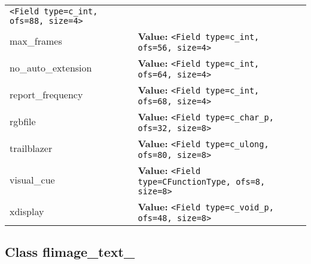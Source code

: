 \begin{longtable}{|p{\varnamewidth}|p{\vardescrwidth}|l}
{\tt {\textless}Field type=c\_int, ofs=88, size=4{\textgreater}}&\\
\cline{1-2}
\raggedright m\-a\-x\-\_\-f\-r\-a\-m\-e\-s\- & \raggedright \textbf{Value:} 
{\tt {\textless}Field type=c\_int, ofs=56, size=4{\textgreater}}&\\
\cline{1-2}
\raggedright n\-o\-\_\-a\-u\-t\-o\-\_\-e\-x\-t\-e\-n\-s\-i\-o\-n\- & \raggedright \textbf{Value:} 
{\tt {\textless}Field type=c\_int, ofs=64, size=4{\textgreater}}&\\
\cline{1-2}
\raggedright r\-e\-p\-o\-r\-t\-\_\-f\-r\-e\-q\-u\-e\-n\-c\-y\- & \raggedright \textbf{Value:} 
{\tt {\textless}Field type=c\_int, ofs=68, size=4{\textgreater}}&\\
\cline{1-2}
\raggedright r\-g\-b\-f\-i\-l\-e\- & \raggedright \textbf{Value:} 
{\tt {\textless}Field type=c\_char\_p, ofs=32, size=8{\textgreater}}&\\
\cline{1-2}
\raggedright t\-r\-a\-i\-l\-b\-l\-a\-z\-e\-r\- & \raggedright \textbf{Value:} 
{\tt {\textless}Field type=c\_ulong, ofs=80, size=8{\textgreater}}&\\
\cline{1-2}
\raggedright v\-i\-s\-u\-a\-l\-\_\-c\-u\-e\- & \raggedright \textbf{Value:} 
{\tt {\textless}Field type=CFunctionType, ofs=8, size=8{\textgreater}}&\\
\cline{1-2}
\raggedright x\-d\-i\-s\-p\-l\-a\-y\- & \raggedright \textbf{Value:} 
{\tt {\textless}Field type=c\_void\_p, ofs=48, size=8{\textgreater}}&\\
\cline{1-2}
\end{longtable}



\subsection{Class flimage\_text\_}

